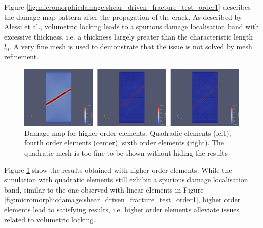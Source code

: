 Figure \ref{fig:micromorphicdamage:shear_driven_fracture_test_order1}
describes the damage map pattern after the propagation of the crack. As
described by Alessi et al., volumetric locking leads to a spurious
damage localisation band with excessive thickness, i.e. a thickness
largely greater than the characteristic length \(l_{0}\). A very fine
mesh is used to demonstrate that the issue is not solved by mesh
refinement.


\begin{figure}[H]
  \centering
  \includegraphics[width=10.cm]{../chapter_02_ef_micromorphic/figures/shear-driven-fracture-damage-results-higher-orders.pdf}
  \caption{Damage map for higher order elements. Quadradic elements (left), fourth order elements (center), sixth order elements (right). The quadratic mesh is too fine to be shown without hiding the results}
  \label{fig:micromorphicdamage:shear_driven_fracture_test_higher_order}
\end{figure}

Figure \ref{fig:micromorphicdamage:shear_driven_fracture_test_higher_order}
show the results obtained with higher order elements. While the
simulation with quadratic elements still exhibit a spurious damage
localisation band, similar to the one observed with linear elements in
Figure \ref{fig:micromorphicdamage:shear_driven_fracture_test_order1}, higher
order elements lead to satisfying results, i.e. higher order elements
alleviate issues related to volumetric locking.


